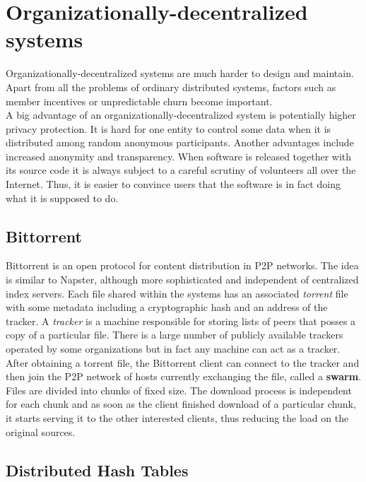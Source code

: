 \documentclass{pracamgren}
\begin{document}
\section{Organizationally-decentralized systems}

Organizationally-decentralized systems are much harder to design and maintain. Apart from all the problems of ordinary distributed systems, factors such as member incentives or unpredictable churn become important.\\

A big advantage of an organizationally-decentralized system is potentially higher privacy protection. It is hard for one entity to control some data when it is distributed among random anonymous participants.
Another advantages include increased anonymity and transparency. When software is released together with its source code it is always subject to a careful scrutiny of  volunteers all over the Internet. Thus, it is easier to convince users that the software is in fact doing what it is supposed to do.\\

\subsection{Bittorrent}

Bittorrent \cite{bittorrent} is an open protocol for content distribution in P2P networks. The idea is similar to Napster, although more sophisticated and independent of centralized index servers. Each file shared within the systems has an associated {\it torrent} file with some metadata including a cryptographic hash and an address of the tracker. A {\it tracker} is a machine responsible for storing lists of peers that posses a copy of a particular file. There is a large number of publicly available trackers operated by some organizations but in fact any machine can act as a tracker.\\

After obtaining a torrent file, the Bittorrent client can connect to the tracker and then join the P2P network of hosts currently exchanging the file, called a {\bf swarm}. Files are divided into chunks of fixed size. The download process is independent for each chunk and as soon as the client finished download of a particular chunk, it starts serving it to the other interested clients, thus reducing the load on the original sources.\\

\subsection{Distributed Hash Tables}
\end{document}
